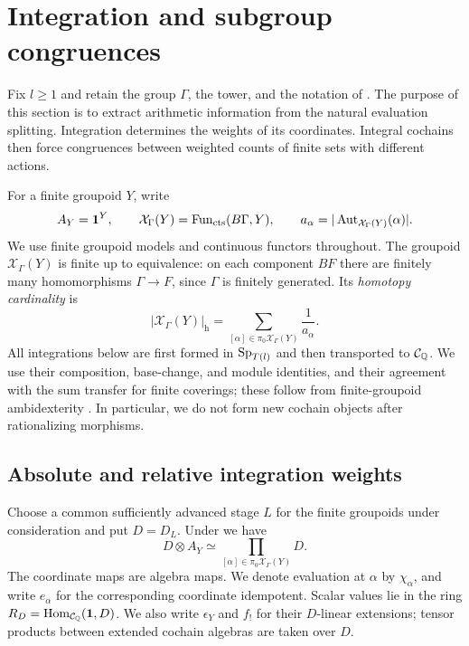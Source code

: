 \section{Integration and subgroup congruences}\label{sec:congruences}

Fix $l\geq1$ and retain the group $\Gamma$, the tower, and the notation of
.  The purpose of this section is to extract arithmetic
information from the natural evaluation splitting.  Integration determines the
weights of its coordinates.  Integral cochains then force congruences between
weighted counts of finite sets with different actions.

For a finite groupoid $Y$, write
\[
 A_Y=\mathbf1^Y,\qquad
 \mathcal X_\Gamma(Y)=\operatorname{Fun}_{\mathrm{cts}}(B\Gamma,Y),\qquad
 a_\alpha=|\operatorname{Aut}_{\mathcal X_\Gamma(Y)}(\alpha)|.
\]
We use finite groupoid models and continuous functors throughout.
The groupoid $\mathcal X_\Gamma(Y)$ is finite up to equivalence: on each
component $BF$ there are finitely many homomorphisms $\Gamma\to F$, since
$\Gamma$ is finitely generated.  Its \emph{homotopy cardinality} is
\[
 |\mathcal X_\Gamma(Y)|_{\mathrm h}
   =\sum_{[\alpha]\in\pi_0\mathcal X_\Gamma(Y)}\frac1{a_\alpha}.
\]
All integrations below are first formed in $\mathrm{Sp}_{T(l)}$ and then transported
to $\mathcal C_{\mathbb Q}$.  We use their composition, base-change, and module
identities, and their agreement with the sum transfer for finite coverings;
these follow from finite-groupoid ambidexterity
\cite[Theorem~5.3.1, Propositions~3.1.10, 3.1.14, and 3.3.1]{CSY}.
In particular, we do not form new cochain objects after rationalizing morphisms.

\subsection{Absolute and relative integration weights}

Choose a common sufficiently advanced stage $L$ for the finite groupoids under
consideration and put $D=D_L$.  Under  we have
\begin{equation}\label{eq:groupoid-coordinates}
 D\otimes A_Y\simeq
 \prod_{[\alpha]\in\pi_0\mathcal X_\Gamma(Y)}D.
\end{equation}
The coordinate maps are algebra maps.  We denote evaluation at $\alpha$ by
$\chi_\alpha$, and write $e_\alpha$ for the corresponding coordinate idempotent.
Scalar values lie in the ring
$R_D=\operatorname{Hom}_{\mathcal C_{\mathbb Q}}(\mathbf1,D)$. We also write $\epsilon_Y$
and $f_!$ for their $D$-linear extensions; tensor products between
extended cochain algebras are taken over $D$.

